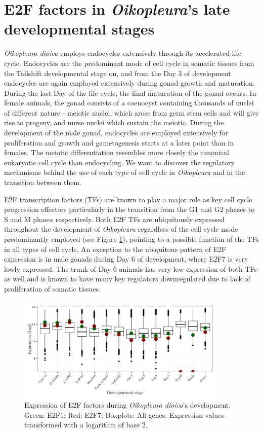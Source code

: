 \documentclass[11pt,twoside,a4paper]{report}
\begin{document}
\section{E2F factors in \textit{Oikopleura}'s late developmental stages}
	\textit{Oikopleura dioica} employs endocycles extensively through its accelerated life cycle. Endocycles are the predominant mode of cell cycle in somatic tissues from the Tailshift developmental stage on, and from the Day 3 of development endocycles are again employed extensively during gonad growth and maturation. During the last Day of the life cycle, the final maturation of the gonad occurs. In female animals, the gonad consists of a coenocyst containing thousands of nuclei of different nature - meiotic nuclei, which arose from germ stem cells and will give rise to progeny, and nurse nuclei which sustain the meiotic. During the development of the male gonad, endocycles are employed extensively for proliferation and growth and gametogenesis starts at a later point than in females. The meiotic differentiation resembles more closely the canonical eukaryotic cell cycle than endocycling. We want to discover the regulatory mechanisms behind the use of each type of cell cycle in \textit{Oikopleura} and in the transition between them.
	
	E2F transcription factors (TFs) are known to play a major role as key cell cycle progression effectors particularly in the transition from the G1 and G2 phases to S and M phases respectively. Both E2F TFs are ubiquitously expressed throughout the development of \textit{Oikopleura} regardless of the cell cycle mode predominantly employed (see Figure \ref{fig:E2F_expression}), pointing to a possible function of the TFs in all types of cell cycle. An exception to the ubiquitous pattern of E2F expression is in male gonads during Day 6 of development, where E2F7 is very lowly expressed. The trunk of Day 6 animals has very low expression of both TFs as well and is known to have many key regulators downregulated due to lack of proliferation of somatic tissues.
	
	\begin{figure}[here]
		\setlength{\belowcaptionskip}{5pt}
		\centering
		\includegraphics[width=0.9\textwidth]{pngs/E2F_expression_+allgenes.png}
		\caption{Expression of E2F factors during \textit{Oikopleura dioica}'s development.
			{
				\footnotesize
					Green: E2F1;
					Red: E2F7;
					Boxplots: All genes.
					Expression values transformed with a logarithm of base 2.
			}
		}
		\label{fig:E2F_expression}
	\end{figure}
	
\end{document}
